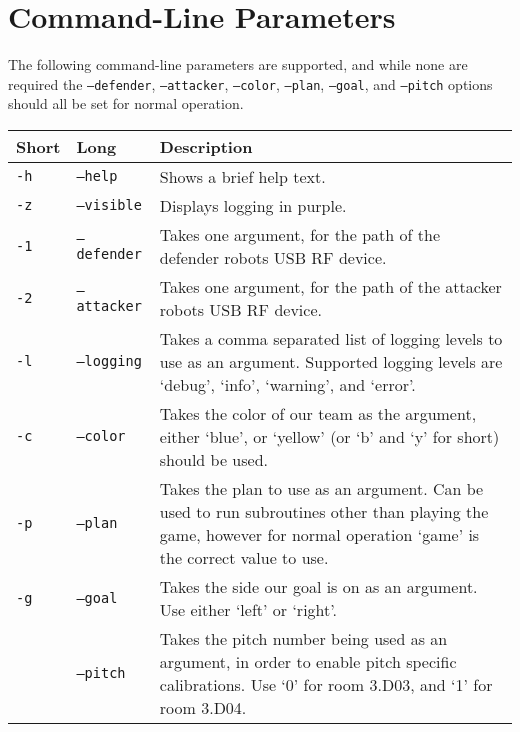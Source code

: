 \section{Command-Line Parameters} \label{params}

The following command-line parameters are supported, and while none are
required the \texttt{--defender}, \texttt{--attacker}, \texttt{--color},
\texttt{--plan}, \texttt{--goal}, and \texttt{--pitch} options should all be
set for normal operation.

\vspace{5mm}

\begin{tabularx}{\textwidth}{ll|X}
    \textbf{Short} & \textbf{Long} & \textbf{Description} \\
    \hline
    \texttt{-h} & \texttt{--help}     & Shows a brief help text. \\
    \texttt{-z} & \texttt{--visible}  & Displays logging in purple. \\
    \texttt{-1} & \texttt{--defender} & Takes one argument, for the path of the
    defender robots USB RF device. \\
    \texttt{-2} & \texttt{--attacker} & Takes one argument, for the path of the
    attacker robots USB RF device. \\
    \texttt{-l} & \texttt{--logging}  & Takes a comma separated list of
    logging levels to use as an argument. Supported logging levels are `debug',
    `info', `warning', and `error'. \\
    \texttt{-c} & \texttt{--color}    & Takes the color of our team as the
    argument, either `blue', or `yellow' (or `b' and `y' for short) should be
    used. \\
    \texttt{-p} & \texttt{--plan}     & Takes the plan to use as an argument.
    Can be used to run subroutines other than playing the game, however for
    normal operation `game' is the correct value to use. \\
    \texttt{-g} & \texttt{--goal}     & Takes the side our goal is on as an
    argument. Use either `left' or `right'. \\
                & \texttt{--pitch}  & Takes the pitch number being used as an
    argument, in order to enable pitch specific calibrations. Use `0' for room
    3.D03, and `1' for room 3.D04. \\
\end{tabularx}

